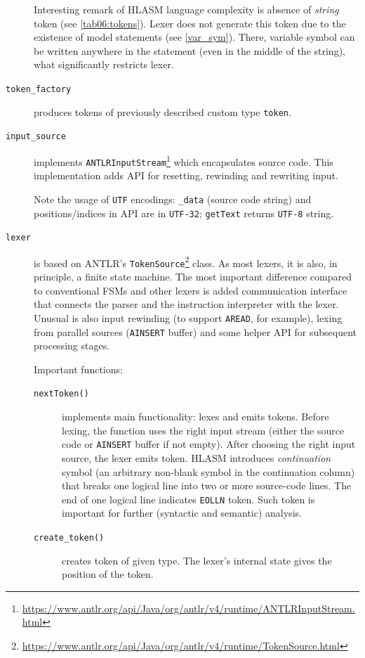 \begin{description}
	Interesting remark of HLASM language complexity is absence of \emph{string} token (see \cref{tab06:tokens}). Lexer does not generate this token due to the existence of model statements (see \cref{var_sym}). There, variable symbol can be written anywhere in the statement (even in the middle of the string), what significantly restricts lexer.
	
	\item[\texttt{token\_factory}] produces tokens of previously described custom type \texttt{token}.
	
	\item[\texttt{input\_source}] implements \texttt{ANTLRInputStream}\footnote{\url{https://www.antlr.org/api/Java/org/antlr/v4/runtime/ANTLRInputStream.html}} which encapsulates source code. This implementation adds API for resetting, rewinding and rewriting input. 
	
	Note the usage of \texttt{UTF} encodings: \texttt{\_data} (source code string) and positions/indices in API are in \texttt{UTF-32}; \texttt{getText} returns \texttt{UTF-8} string.
	
	\item[\texttt{lexer}] is based on ANTLR's \texttt{TokenSource}\footnote{\url{https://www.antlr.org/api/Java/org/antlr/v4/runtime/TokenSource.html}} class. As most lexers, it is also, in principle, a finite state machine. The most important difference compared to conventional FSMs and other lexers is added communication interface that connects the parser and the instruction interpreter with the lexer. Unusual is also input rewinding (to support \texttt{AREAD}, for example), lexing from parallel sources (\texttt{AINSERT} buffer) and some helper API for subsequent processing stages.
	
	Important functions:
	
	\begin{description}
		\item[\texttt{nextToken()}] implements main functionality: lexes and emits tokens. Before lexing, the function uses the right input stream (either the source code or \texttt{AINSERT} buffer if not empty). After choosing the right input source, the lexer emits token. HLASM introduces \textit{continuation} symbol (an arbitrary non-blank symbol in the continuation column) that breaks one logical line into two or more source-code lines. The end of one logical line indicates \texttt{EOLLN} token. Such token is important for further (syntactic and semantic) analysis.
		
		
		\item[\texttt{create\_token()}] creates token of given type. The lexer's internal state gives the position of the token. 
		

\end{description}
\end{description}
